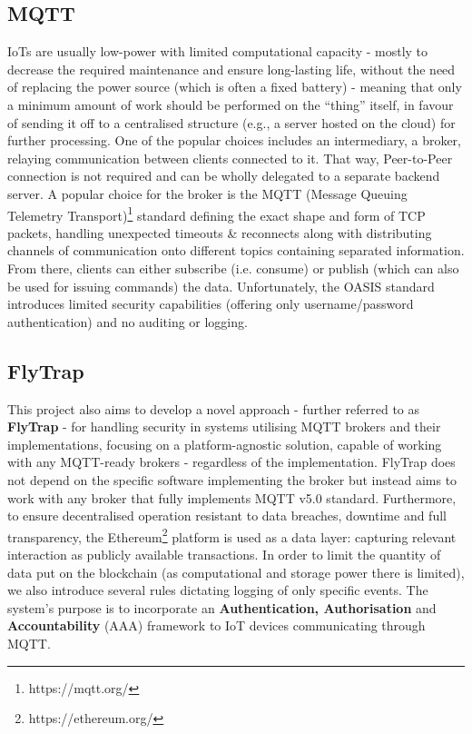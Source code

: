 \subsection{MQTT}
IoTs are usually low-power with limited computational capacity - mostly to decrease the required maintenance and ensure long-lasting life, without the need of replacing the power source (which is often a fixed battery) - meaning that only a minimum amount of work should be performed on the ``thing'' itself, in favour of sending it off to a centralised structure (e.g., a server hosted on the cloud) for further processing. One of the popular choices includes an intermediary, a broker, relaying communication between clients connected to it. That way, Peer-to-Peer connection is not required and can be wholly delegated to a separate backend server. A popular choice for the broker is the MQTT (Message Queuing Telemetry Transport)\footnote{https://mqtt.org/} standard defining the exact shape and form of TCP packets, handling unexpected timeouts \& reconnects along with distributing channels of communication onto different topics containing separated information. From there, clients can either subscribe (i.e. consume) or publish (which can also be used for issuing commands) the data. Unfortunately, the OASIS standard introduces limited security capabilities (offering only username/password authentication) and no auditing or logging.

\subsection{FlyTrap}
This project also aims to develop a novel approach - further referred to as \textbf{FlyTrap} - for handling security in systems utilising MQTT brokers and their implementations, focusing on a platform-agnostic solution, capable of working with any MQTT-ready brokers - regardless of the implementation. FlyTrap does not depend on the specific software implementing the broker but instead aims to work with any broker that fully implements MQTT v5.0 standard. Furthermore, to ensure decentralised operation resistant to data breaches, downtime and full transparency, the Ethereum\footnote{https://ethereum.org/} platform is used as a data layer: capturing relevant interaction as publicly available transactions. In order to limit the quantity of data put on the blockchain (as computational and storage power there is limited), we also introduce several rules dictating logging of only specific events. The system's purpose is to incorporate an \textbf{Authentication, Authorisation} and \textbf{Accountability} (AAA) framework to IoT devices communicating through MQTT.

